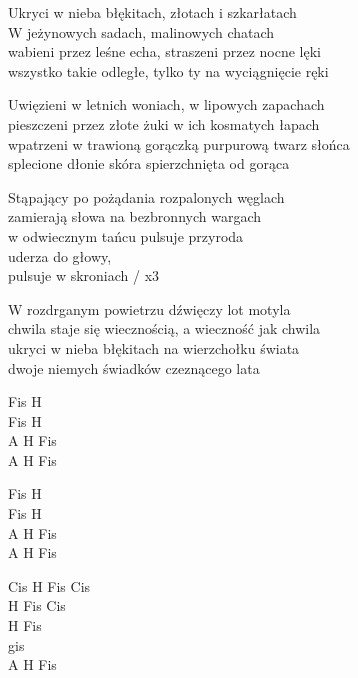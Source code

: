 \begin{text}
    \begin{smallTwo}
    Ukryci w nieba błękitach, złotach i szkarłatach\\
    W jeżynowych sadach, malinowych chatach\\
    wabieni przez leśne echa, straszeni przez nocne lęki\\
    wszystko takie odległe, tylko ty na wyciągnięcie ręki

    Uwięzieni w letnich woniach, w lipowych zapachach\\
    pieszczeni przez złote żuki w ich kosmatych łapach\\
    wpatrzeni w trawioną gorączką purpurową twarz słońca\\
    splecione dłonie skóra spierzchnięta od gorąca

    Stąpający po pożądania rozpalonych węglach\\
    zamierają słowa na bezbronnych wargach\\
    w odwiecznym tańcu pulsuje przyroda\\
    uderza do głowy,\\
    pulsuje w skroniach / x3

    W rozdrganym powietrzu dźwięczy lot motyla\\
    chwila staje się wiecznością, a wieczność jak chwila\\
    ukryci w nieba błękitach na wierzchołku świata\\
    dwoje niemych świadków czeznącego lata
\end{smallTwo}
\end{text}
\begin{chord}
    \begin{smallTwo}
    Fis H\\
    Fis H\\
    A H Fis\\
    A H Fis

    Fis H\\
    Fis H\\
    A H Fis\\
    A H Fis

    Cis H Fis Cis\\
    H Fis Cis\\
    H Fis\\
    gis\\
    A H Fis
\end{smallTwo}
\end{chord}